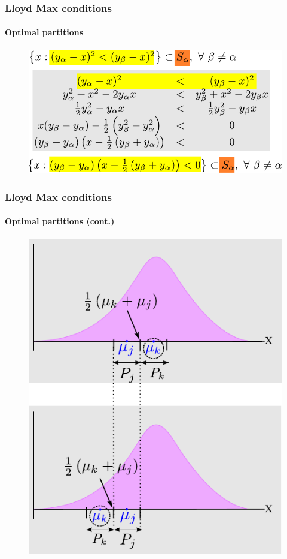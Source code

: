 \begin{frame}
\frametitle{Lloyd Max conditions}
\framesubtitle{Optimal partitions}
\logoCSIPCPL\mypagenum
	\begin{figure}				
		\includegraphics[width=1.0\textwidth]{thesis/Quantization_optimalPartitions.pdf}
	\end{figure}
\end{frame}



\begin{frame}[plain]
\frametitle{Lloyd Max conditions}
\framesubtitle{Optimal partitions (cont.)}
\logoCSIPCPL\mypagenum
	\begin{changemargin}{-1.3in}{0in}
		\begin{figure}				
			\includegraphics[height=0.8\textheight]{thesis/Quantization_optimalPartitions2.pdf}
		\end{figure}
	\end{changemargin}
\end{frame}


